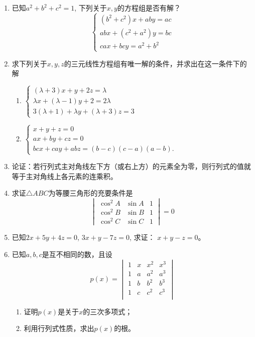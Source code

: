 \begin{enumerate}
\item 已知$a^2+b^2+c^2=1$, 下列关于$x,y$的方程组是否有解？
\[\begin{cases}
    (b^2+c^2)x+aby=ac\\
    abx+ (c^2+a^2) y=bc\\
    cax+bcy=a^2+b^2
\end{cases}\]


\item 求下列关于$x,y,z$的三元线性方程组有唯一解的条件，并求出在这一条件下的解
\begin{enumerate}
    \item $\begin{cases}
        (\lambda+3) x+y+2z=\lambda\\
        \lambda x+ (\lambda-1) y+2=2\lambda\\
3 (\lambda+1) +\lambda y+ (\lambda+3) z=3
    \end{cases}$
    \item $\begin{cases}
        x+y+z=0\\
        ax+by+cz=0\\
        bcx+cay+abz= (b-c) (c-a)(a-b).
    \end{cases}$
\end{enumerate}


\item 论证：若行列式主对角线左下方（或右上方）的元素全为零，则行列式的值就等于主对角线上各元素的连乘积。


\item 求证$\triangle ABC$为等腰三角形的充要条件是
\[\begin{vmatrix}
    \cos^2A& \sin A &1\\
    \cos^2B& \sin B &1\\
    \cos^2C& \sin C &1
\end{vmatrix}=0\]

\item 已知$2x+5y+4z=0$, $3x+y-7z=0$, 求证：
$x+y-z=0$。
\item 已知$a,b,c$是互不相同的数，且设
\[p (x) =\begin{vmatrix}
    1&x&x^2&x^3\\
    1&a&a^2&a^3\\
    1&b&b^2&b^3\\
    1&c&c^2&c^3\\
\end{vmatrix}\]
\begin{enumerate}
    \item 证明$p(x)$是关于$x$的三次多项式；
    \item 利用行列式性质，求出$p(x)$的根。
\end{enumerate}



\end{enumerate}
